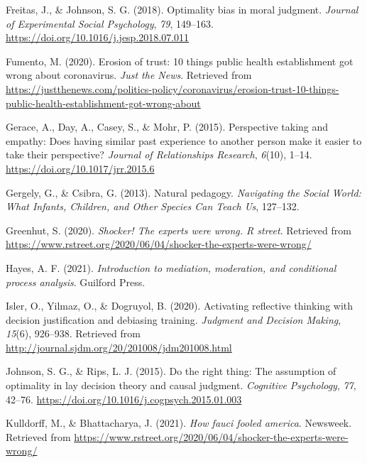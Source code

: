 \documentclass[
  man,floatsintext]{apa6}
\newlength{\cslhangindent}
\newlength{\cslentryspacingunit} %
\newenvironment{CSLReferences}[2] %
 {%
  \setlength{\parindent}{0pt}
  \ifodd #1
  \let\oldpar\par
  \def\par{\hangindent=\cslhangindent\oldpar}
  \fi
  \setlength{\parskip}{#2\cslentryspacingunit}
 }%
 {}
\begin{document}
\begin{CSLReferences}{1}{0}
\leavevmode{}%
Freitas, J., \& Johnson, S. G. (2018). Optimality bias in moral judgment. \emph{Journal of Experimental Social Psychology}, \emph{79}, 149--163. \url{https://doi.org/10.1016/j.jesp.2018.07.011}

\leavevmode{}%
Fumento, M. (2020). Erosion of trust: 10 things public health establishment got wrong about coronavirus. \emph{Just the News}. Retrieved from \url{https://justthenews.com/politics-policy/coronavirus/erosion-trust-10-things-public-health-establishment-got-wrong-about}

\leavevmode{}%
Gerace, A., Day, A., Casey, S., \& Mohr, P. (2015). Perspective taking and empathy: Does having similar past experience to another person make it easier to take their perspective? \emph{Journal of Relationships Research}, \emph{6}(10), 1--14. \url{https://doi.org/10.1017/jrr.2015.6}

\leavevmode{}%
Gergely, G., \& Csibra, G. (2013). Natural pedagogy. \emph{Navigating the Social World: What Infants, Children, and Other Species Can Teach Us}, 127--132.

\leavevmode{}%
Greenhut, S. (2020). \emph{Shocker! The experts were wrong. R street}. Retrieved from \url{https://www.rstreet.org/2020/06/04/shocker-the-experts-were-wrong/}

\leavevmode{}%
Hayes, A. F. (2021). \emph{Introduction to mediation, moderation, and conditional process analysis}. Guilford Press.

\leavevmode{}%
Isler, O., Yilmaz, O., \& Dogruyol, B. (2020). Activating reflective thinking with decision justification and debiasing training. \emph{Judgment and Decision Making}, \emph{15}(6), 926--938. Retrieved from \url{http://journal.sjdm.org/20/201008/jdm201008.html}

\leavevmode{}%
Johnson, S. G., \& Rips, L. J. (2015). Do the right thing: The assumption of optimality in lay decision theory and causal judgment. \emph{Cognitive Psychology}, \emph{77}, 42--76. \url{https://doi.org/10.1016/j.cogpsych.2015.01.003}

\leavevmode{}%
Kulldorff, M., \& Bhattacharya, J. (2021). \emph{How fauci fooled america}. Newsweek. Retrieved from \url{https://www.rstreet.org/2020/06/04/shocker-the-experts-were-wrong/}


\end{CSLReferences}
\end{document}
